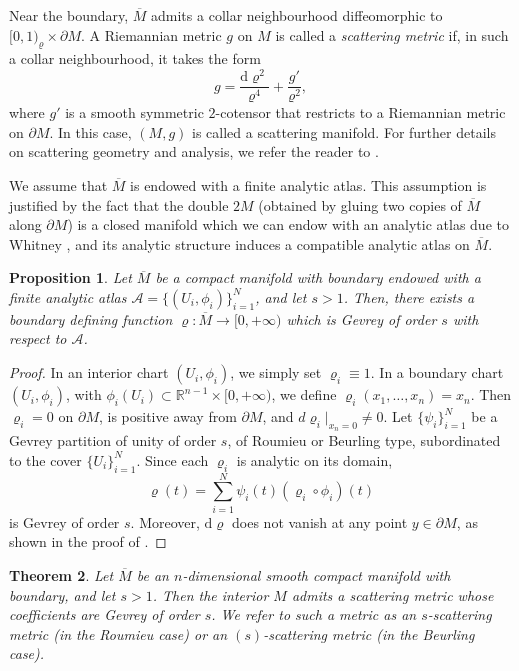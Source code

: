 \documentclass[11pt,reqno]{amsart}
\numberwithin{equation}{section}
\newtheorem{theorem}{Theorem}[section]
\newtheorem{proposition}[theorem]{Proposition}
\begin{document}
	Near the boundary, $\overline{M}$ admits a collar neighbourhood diffeomorphic to $[0,1)_{\varrho}\times\partial M$. A Riemannian metric $g$ on $M$ is called a \emph{scattering metric} if, in such a collar neighbourhood, it takes the form
	\[
	g = \frac{\mathrm{d}\varrho^2}{\varrho^4} + \frac{g'}{\varrho^2},
	\]
	where $g'$ is a smooth symmetric $2$-cotensor that restricts to a Riemannian metric on $\partial M$. In this case, $(M,g)$ is called a scattering manifold. For further details on scattering geometry and analysis, we refer the reader to \cite{Melrose_APS,Melrose_SST,Melrose_GST}.

	We assume that $\overline{M}$ is endowed with a finite analytic atlas. This assumption is justified by the fact that the double $2M$ (obtained by gluing two copies of $\overline{M}$ along $\partial M$) is a closed manifold which we can endow with an analytic atlas due to Whitney \cite{Whitney}, and its analytic structure induces a compatible analytic atlas on $\overline{M}$.
	
	\begin{proposition}\label{bdf_gev}
		Let $\overline{M}$ be a compact manifold with boundary endowed with a finite analytic atlas $\mathscr{A}=\{(U_i,\phi_i)\}_{i=1}^N$, and let $s>1$. Then, there exists a boundary defining function $\varrho:\overline{M}\to[0,+\infty)$ which is Gevrey of order $s$ with respect to $\mathscr{A}$.
	\end{proposition}

	\begin{proof}
		In an interior chart $(U_i,\phi_i)$, we simply set $\varrho_i \equiv 1$. In a boundary chart $(U_i,\phi_i)$, with $\phi_i(U_i) \subset \mathbb{R}^{n-1} \times [0,+\infty)$, we define $\varrho_i(x_1,\dots,x_n) = x_n$. Then $\varrho_i = 0$ on $\partial M$, is positive away from $\partial M$,
		and $\displaystyle d\varrho_i|_{x_n=0}\not=0$. 
		Let $\{\psi_i\}_{i=1}^N$ be a Gevrey partition of unity of order $s$, of Roumieu or Beurling type, subordinated to the cover $\{U_i\}_{i=1}^N$. Since each $\varrho_i$ is analytic on its domain,
		\[
		\varrho(t) = \sum_{i=1}^N \psi_i(t)(\varrho_i \circ \phi_i)(t)
		\]
		is Gevrey of order $s$. Moreover, $\mathrm{d}\varrho$ does not vanish at any point $y \in \partial M$, as shown in the proof of \cite[Proposition 5.41]{Lee_smooth}.
	\end{proof}

	\begin{theorem}
		Let $\overline{M}$ be an $n$-dimensional smooth compact manifold with boundary, and let $s>1$. Then the interior $M$ admits a scattering metric whose coefficients are Gevrey of order $s$. We refer to such a metric as an $s$-scattering metric (in the Roumieu case) or an $(s)$-scattering metric (in the Beurling case).
	\end{theorem}
	
\end{document}
